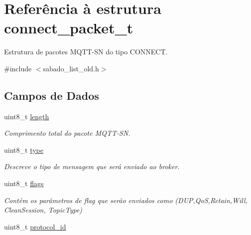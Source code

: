 \hypertarget{structconnect__packet__t}{\section{Referência à estrutura connect\+\_\+packet\+\_\+t}
\label{structconnect__packet__t}
}


Estrutura de pacotes M\+Q\+T\+T-\/\+S\+N do tipo C\+O\+N\+N\+E\+C\+T.  




{\ttfamily \#include $<$sabado\+\_\+list\+\_\+old.\+h$>$}

\subsection*{Campos de Dados}
\begin{DoxyCompactItemize}
\item 
\hypertarget{group__Pacotes_gaf9d495c1655d813d553030485d00fea7}{uint8\+\_\+t \hyperlink{group__Pacotes_gaf9d495c1655d813d553030485d00fea7}{length}}\label{group__Pacotes_gaf9d495c1655d813d553030485d00fea7}

\begin{DoxyCompactList}\small\item\em Comprimento total do pacote M\+Q\+T\+T-\/\+S\+N. \end{DoxyCompactList}\item 
\hypertarget{group__Pacotes_ga7aead736a07eaf25623ad7bfa1f0ee2d}{uint8\+\_\+t \hyperlink{group__Pacotes_ga7aead736a07eaf25623ad7bfa1f0ee2d}{type}}\label{group__Pacotes_ga7aead736a07eaf25623ad7bfa1f0ee2d}

\begin{DoxyCompactList}\small\item\em Descreve o tipo de mensagem que será enviado ao broker. \end{DoxyCompactList}\item 
\hypertarget{group__Pacotes_gab6b306ef981f5e21bb41ea2c2dbe8cd9}{uint8\+\_\+t \hyperlink{group__Pacotes_gab6b306ef981f5e21bb41ea2c2dbe8cd9}{flags}}\label{group__Pacotes_gab6b306ef981f5e21bb41ea2c2dbe8cd9}

\begin{DoxyCompactList}\small\item\em Contém os parâmetros de flag que serão enviados como (D\+U\+P,Qo\+S,Retain,Will, Clean\+Session, Topic\+Type) \end{DoxyCompactList}\item 
\hypertarget{group__Pacotes_gac600161f386567cf3ab274f4afbd5981}{uint8\+\_\+t \hyperlink{group__Pacotes_gac600161f386567cf3ab274f4afbd5981}{protocol\+\_\+id}}\label{group__Pacotes_gac600161f386567cf3ab274f4afbd5981}


\end{DoxyCompactItemize}
